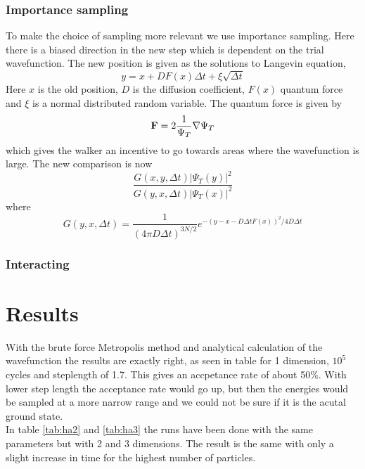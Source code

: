 \documentclass[12pt]{article}
\begin{document}
  \subsubsection{Importance sampling}
  To make the choice of sampling more relevant we use importance sampling.
  Here there is a biased direction in the new step which is dependent on the trial wavefunction.
  The new position is given as the solutions to Langevin equation,
  \begin{equation}
    y = x + DF(x)\Delta t + \xi\sqrt{\Delta t}
  \end{equation}
  Here $x$ is the old position, $D$ is the diffusion coefficient, $F(x)$ quantum force and $\xi$
  is a normal distributed random variable.
  The quantum force is given by 
  \begin{equation}
    {\bf F}= 2\frac{1}{\Psi_T}\nabla\Psi_T
  \end{equation}
  which gives the walker an incentive to go towards areas where the wavefunction is large.
  The new comparison is now
  \begin{equation}
    \frac{G(x,y,\Delta t)|\Psi_T(y)|^2}{G(y,x,\Delta t)|\Psi_T(x)|^2}
  \end{equation}
  where 
  \[ G(y,x,\Delta t) = \frac{1}{(4\pi D\Delta t)^{3N/2}}e^{-(y-x-D\Delta tF(x))^2/4D\Delta t}\]
  \subsubsection{Interacting}

  
  \section{Results}
  With the brute force Metropolis method and analytical calculation of the wavefunction the
  results are exactly right, as seen in table for 1 dimension, $10^5$ cycles and steplength
  of 1.7. This gives an accpetance rate of about 50\%. With lower step length the acceptance
  rate would go up, but then the energies would be sampled at a more narrow range and we could not
  be sure if it is the acutal ground state.
  \\
  In table \ref{tab:ha2} and \ref{tab:ha3} the runs have been done with the same parameters but with
  2 and 3 dimensions. The result is the same with only a slight increase in time for the highest
  number of particles.
  
  \newpage
  \appendix
  
\end{document}
